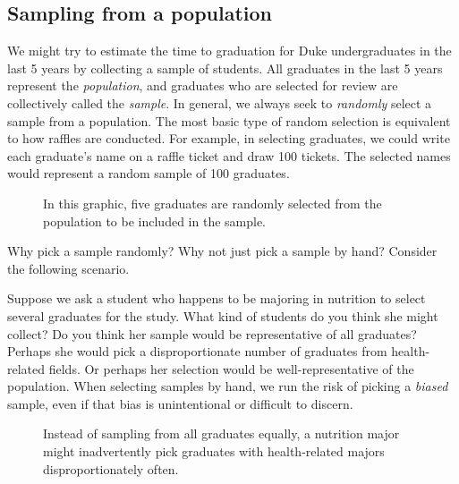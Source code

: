 \subsection{Sampling from a population}


We might try to estimate the time to graduation for Duke undergraduates in the last 5 years by collecting a sample of students. All graduates in the last 5 years represent the \emph{population}, and graduates who are selected for review are collectively called the \emph{sample}. In general, we always seek to \emph{randomly} select a sample from a population. The most basic type of random selection is equivalent to how raffles are conducted. For example, in selecting graduates, we could write each graduate's name on a raffle ticket and draw 100 tickets. The selected names would represent a random sample of 100 graduates.

\begin{figure}[ht]
  \centering
  \caption{In this graphic, five graduates are randomly
      selected from the population to be included in the
      sample.}
  \label{popToSampleGraduates}
\end{figure}

Why pick a sample randomly? Why not just pick a sample by hand? Consider the following scenario.

\begin{examplewrap}
\begin{nexample}{Suppose we ask a student who happens to be majoring in nutrition to select several graduates for the study. What kind of students do you think she might collect? Do you think her sample would be representative of all graduates?}
Perhaps she would pick a disproportionate number of graduates from health-related fields. Or perhaps her selection would be well-representative of the population. When selecting samples by hand, we run the risk of picking a \emph{biased} sample, even if that bias is unintentional or difficult to discern.
\end{nexample}
\end{examplewrap}

\begin{figure}
  \centering
  \caption{Instead of sampling from all graduates equally,
      a nutrition major might inadvertently pick graduates
      with health-related majors disproportionately often.}
  \label{popToSubSampleGraduates}
\end{figure}


